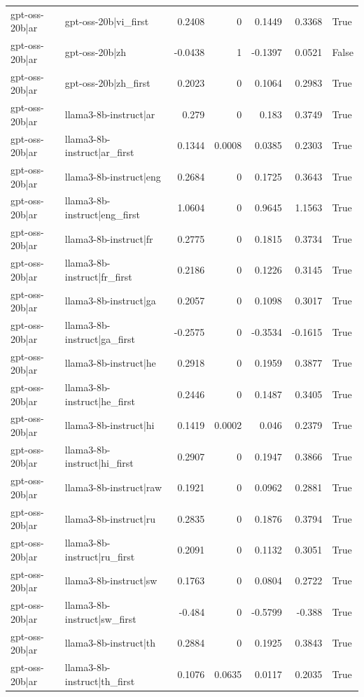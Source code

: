\begin{table}
\begin{tabular}{l l r r r r l}
gpt-oss-20b|ar & gpt-oss-20b|vi_first & 0.2408 & 0 & 0.1449 & 0.3368 & True \\
gpt-oss-20b|ar & gpt-oss-20b|zh & -0.0438 & 1 & -0.1397 & 0.0521 & False \\
gpt-oss-20b|ar & gpt-oss-20b|zh_first & 0.2023 & 0 & 0.1064 & 0.2983 & True \\
gpt-oss-20b|ar & llama3-8b-instruct|ar & 0.279 & 0 & 0.183 & 0.3749 & True \\
gpt-oss-20b|ar & llama3-8b-instruct|ar_first & 0.1344 & 0.0008 & 0.0385 & 0.2303 & True \\
gpt-oss-20b|ar & llama3-8b-instruct|eng & 0.2684 & 0 & 0.1725 & 0.3643 & True \\
gpt-oss-20b|ar & llama3-8b-instruct|eng_first & 1.0604 & 0 & 0.9645 & 1.1563 & True \\
gpt-oss-20b|ar & llama3-8b-instruct|fr & 0.2775 & 0 & 0.1815 & 0.3734 & True \\
gpt-oss-20b|ar & llama3-8b-instruct|fr_first & 0.2186 & 0 & 0.1226 & 0.3145 & True \\
gpt-oss-20b|ar & llama3-8b-instruct|ga & 0.2057 & 0 & 0.1098 & 0.3017 & True \\
gpt-oss-20b|ar & llama3-8b-instruct|ga_first & -0.2575 & 0 & -0.3534 & -0.1615 & True \\
gpt-oss-20b|ar & llama3-8b-instruct|he & 0.2918 & 0 & 0.1959 & 0.3877 & True \\
gpt-oss-20b|ar & llama3-8b-instruct|he_first & 0.2446 & 0 & 0.1487 & 0.3405 & True \\
gpt-oss-20b|ar & llama3-8b-instruct|hi & 0.1419 & 0.0002 & 0.046 & 0.2379 & True \\
gpt-oss-20b|ar & llama3-8b-instruct|hi_first & 0.2907 & 0 & 0.1947 & 0.3866 & True \\
gpt-oss-20b|ar & llama3-8b-instruct|raw & 0.1921 & 0 & 0.0962 & 0.2881 & True \\
gpt-oss-20b|ar & llama3-8b-instruct|ru & 0.2835 & 0 & 0.1876 & 0.3794 & True \\
gpt-oss-20b|ar & llama3-8b-instruct|ru_first & 0.2091 & 0 & 0.1132 & 0.3051 & True \\
gpt-oss-20b|ar & llama3-8b-instruct|sw & 0.1763 & 0 & 0.0804 & 0.2722 & True \\
gpt-oss-20b|ar & llama3-8b-instruct|sw_first & -0.484 & 0 & -0.5799 & -0.388 & True \\
gpt-oss-20b|ar & llama3-8b-instruct|th & 0.2884 & 0 & 0.1925 & 0.3843 & True \\
gpt-oss-20b|ar & llama3-8b-instruct|th_first & 0.1076 & 0.0635 & 0.0117 & 0.2035 & True \\

\end{tabular}
\end{table}
